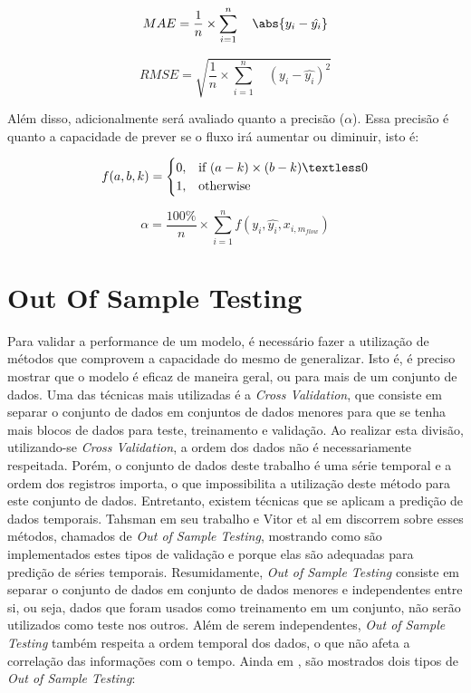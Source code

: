 \begin{equation}
\label{eq:mae}
MAE = \frac{1}{n} \times \sum_{i=1}^{n} \quad \abs{y_i - \hat{y_i}}
\end{equation}

\begin{equation}
\label{eq:rmse}
RMSE = \sqrt{ \frac{1}{n} \times \sum_{i=1}^{n} \quad (y_i - \hat{y_i}) ^ 2}
\end{equation}

Além disso, adicionalmente será avaliado quanto a precisão (\(\alpha\)). Essa precisão é quanto a capacidade de prever se o fluxo irá aumentar ou diminuir, isto é:

\begin{equation}
f(a, b, k) =
\begin{cases}
  0, & \text{if}\ (a - k) \times (b - k) \textless 0 \\
  1, & \text{otherwise}
\end{cases}
\end{equation}

\begin{equation}
\alpha = \frac{100\%}{n} \times \sum_{i=1}^{n} f(y_i, \hat{y_i}, x_{i, m_{flow}})
\end{equation}

\section{Out Of Sample Testing}

Para validar a performance de um modelo, é necessário fazer a utilização de métodos que comprovem a capacidade do mesmo de generalizar. Isto é, é preciso mostrar que o modelo é eficaz de maneira geral, ou para mais de um conjunto de dados. Uma das técnicas mais utilizadas é a \textit{Cross Validation}, que consiste em separar o conjunto de dados em conjuntos de dados menores para que se tenha mais blocos de dados para teste, treinamento e validação. Ao realizar esta divisão, utilizando-se \textit{Cross Validation}, a ordem dos dados não é necessariamente respeitada. Porém, o conjunto de dados deste trabalho é uma série temporal e a ordem dos registros importa, o que impossibilita a utilização deste método para este conjunto de dados. Entretanto, existem técnicas que se aplicam a predição de dados temporais. Tahsman em seu trabalho \cite{Tashman_2000} e Vitor et al em \cite{Vitor_2019} discorrem sobre esses métodos, chamados de \textit{Out of Sample Testing}, mostrando como são implementados estes tipos de validação e porque elas são adequadas para predição de séries temporais. Resumidamente, \textit{Out of Sample Testing} consiste em separar o conjunto de dados em conjunto de dados menores e independentes entre si, ou seja, dados que foram usados como treinamento em um conjunto, não serão utilizados como teste nos outros. Além de serem independentes, \textit{Out of Sample Testing} também respeita a ordem temporal dos dados, o que não afeta a correlação das informações com o tempo. Ainda em \cite{Tashman_2000}, são mostrados dois tipos de \textit{Out of Sample Testing}:

